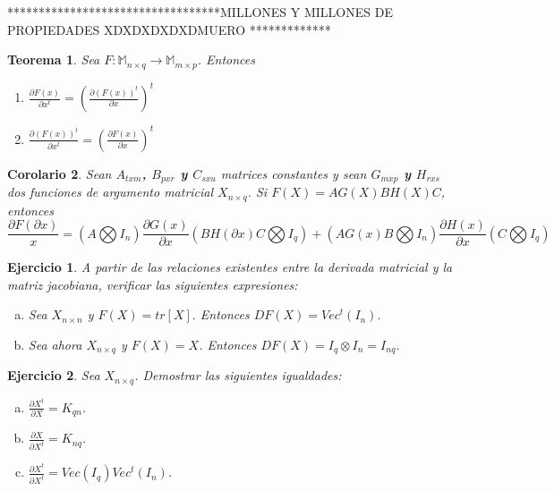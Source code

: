 \documentclass{article}
\theoremstyle{theorem-style}  %
\newtheorem{theorem}{Teorema}[section]  %
\newtheorem{corollary}[theorem]{Corolario} %
\theoremstyle{definition-style}
\theoremstyle{example-style}
\theoremstyle{exercise-style}
\newtheorem{exercise}{Ejercicio}[section]
\begin{document}
**********************************MILLONES Y MILLONES DE PROPIEDADES XDXDXDXDXDMUERO *************

\begin{theorem}
	\textit{Sea $F:\mathbb{M}_{n\times q}\rightarrow \mathbb{M}_{m\times p}$. Entonces }
	\begin{enumerate}
		\item $\frac{\partial F(x)}{\partial x^t} =(\frac{\partial (F(x))^t}{\partial x})^t $
		
		\item $\frac{\partial (F(x))^t}{\partial x^t} =(\frac{\partial F(x)}{\partial x})^t$
	\end{enumerate}
\end{theorem}

\begin{corollary}
\textit{	Sean \textbf{$A_{txm}$, $B_{pxr}$ y $C_{sxu}$} matrices constantes y sean \textbf{$G_{mxp}$ y $H_{rxs}$} dos funciones de argumento matricial $X_{n\times 	q}$. Si \textbf{$F(X) = AG(X)BH(X)C$}, entonces
	\textbf{$$ \frac{\partial F(\partial x)}{x}= (A \bigotimes I_n)\frac{\partial G(x)}{\partial x}(BH(\partial x)C \bigotimes I_q) + (AG(x)B \bigotimes I_n)\frac{\partial H(x)}{\partial x}(C \bigotimes I_q)$$}
	 }
\end{corollary}



\begin{exercise}
	A partir de las relaciones existentes entre la derivada matricial y la matriz jacobiana, verificar las siguientes expresiones:
	\begin{enumerate}[a)]
		\item Sea $X_{n\times n}$ y $F(X) = tr[X].$ Entonces $DF(X) = Vec^t(I_n).$
		\item Sea ahora $X_{n\times q}$ y $F(X) =X$. Entonces $DF(X) = I_q \otimes I_n = I_{nq}$.
	\end{enumerate}
\end{exercise}

\begin{exercise}
	Sea $X_{n\times q}$. Demostrar las siguientes igualdades:
	\begin{enumerate}[a)]
		\item $\displaystyle \frac{\partial X^t}{\partial X} = K_{qn}$.
		\item $\displaystyle \frac{\partial X}{\partial X^t} = K_{nq}$.
		\item $\displaystyle \frac{\partial X^t}{\partial X^t} = Vec(I_q)Vec^t(I_n)$.
	\end{enumerate}
\end{exercise}
\end{document}
